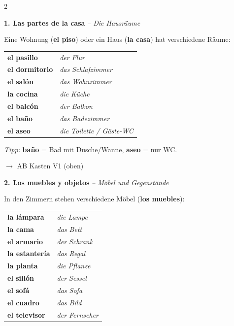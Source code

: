 \documentclass[11pt, a4paper]{article}
\newcommand{\seriftext}[1]{{\fontfamily{ppl}\selectfont #1}}
\newcommand{\es}[1]{\seriftext{\textbf{#1}}}
\newcommand{\de}[1]{\textit{\textcolor{akzent}{#1}}}
\newcommand{\abmark}[1]{{\footnotesize\textcolor{akzent}{$\rightarrow$ AB #1}}}
\newcommand{\abschnitt}[2]{\noindent\textbf{\large #1. #2}}
\begin{document}
\begin{multicols}{2}

\abschnitt{1}{Las partes de la casa} \de{-- Die Hausräume}

\vspace{4pt}

Eine Wohnung (\es{el piso}) oder ein Haus (\es{la casa}) hat verschiedene Räume:

\vspace{3pt}

{\small
\begin{tabular}{@{}ll@{}}
\es{el pasillo} & \de{der Flur} \\[0.3em]
\es{el dormitorio} & \de{das Schlafzimmer} \\[0.3em]
\es{el salón} & \de{das Wohnzimmer} \\[0.3em]
\es{la cocina} & \de{die Küche} \\[0.3em]
\es{el balcón} & \de{der Balkon} \\[0.3em]
\es{el baño} & \de{das Badezimmer} \\[0.3em]
\es{el aseo} & \de{die Toilette / Gäste-WC} \\
\end{tabular}}

\vspace{4pt}

\begin{tippbox}
\footnotesize\textit{Tipp:} \es{baño} = Bad mit Dusche/Wanne, \es{aseo} = nur WC.
\end{tippbox}

\abmark{Kasten V1 (oben)}

\vspace{8pt}

\abschnitt{2}{Los muebles y objetos} \de{-- Möbel und Gegenstände}

\vspace{4pt}

In den Zimmern stehen verschiedene Möbel (\es{los muebles}):

\vspace{3pt}

{\footnotesize
\begin{tabular}{@{}ll@{}}
\es{la lámpara} & \de{die Lampe} \\
\es{la cama} & \de{das Bett} \\
\es{el armario} & \de{der Schrank} \\
\es{la estantería} & \de{das Regal} \\
\es{la planta} & \de{die Pflanze} \\
\es{el sillón} & \de{der Sessel} \\
\es{el sofá} & \de{das Sofa} \\
\es{el cuadro} & \de{das Bild} \\
\es{el televisor} & \de{der Fernseher} \\
\end{tabular}}


\end{multicols}
\end{document}
